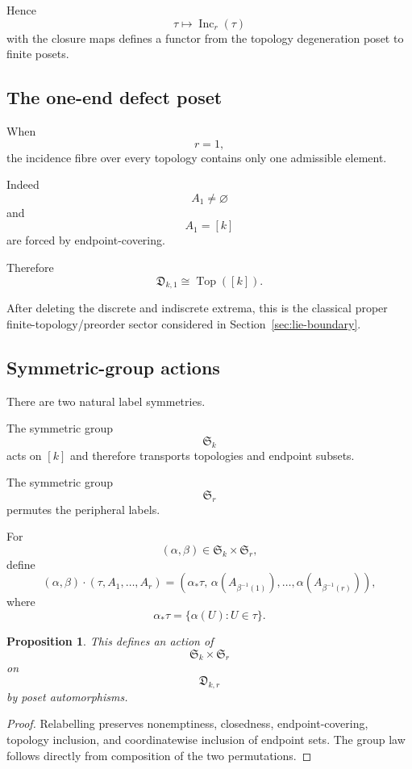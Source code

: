 \documentclass[11pt]{article}
\theoremstyle{plain}
\newtheorem{proposition}[theorem]{Proposition}
\theoremstyle{definition}
\begin{document}
Hence
\[
\tau
\longmapsto
\operatorname{Inc}_r(\tau)
\]
with the closure maps defines a functor from the topology degeneration
poset to finite posets.


\subsection{The one-end defect poset}
\label{subsec:r1-poset-preview}

When
\[
r=1,
\]
the incidence fibre over every topology contains only one admissible
element.

Indeed
\[
A_1\neq\varnothing
\]
and
\[
A_1=[k]
\]
are forced by endpoint-covering.

Therefore
\[
\mathfrak D_{k,1}
\cong
\operatorname{Top}([k]).
\]

After deleting the discrete and indiscrete extrema, this is the classical proper finite-topology/preorder sector considered in Section~\ref{sec:lie-boundary}.

\subsection{Symmetric-group actions}
\label{subsec:defect-poset-symmetry}

There are two natural label symmetries.

The symmetric group
\[
\mathfrak S_k
\]
acts on $[k]$ and therefore transports topologies and endpoint subsets.

The symmetric group
\[
\mathfrak S_r
\]
permutes the peripheral labels.

For
\[
(\alpha,\beta)
\in
\mathfrak S_k\times\mathfrak S_r,
\]
define
\[
(\alpha,\beta)\cdot
(\tau,A_1,\ldots,A_r)
=
\left(
\alpha_*\tau,\,
\alpha(A_{\beta^{-1}(1)}),
\ldots,
\alpha(A_{\beta^{-1}(r)})
\right),
\]
where
\[
\alpha_*\tau
=
\{\alpha(U):U\in\tau\}.
\]

\begin{proposition}
\label{prop:Skr-action}
This defines an action of
\[
\mathfrak S_k\times\mathfrak S_r
\]
on
\[
\mathfrak D_{k,r}
\]
by poset automorphisms.
\end{proposition}

\begin{proof}
Relabelling preserves nonemptiness, closedness, endpoint-covering, topology
inclusion, and coordinatewise inclusion of endpoint sets.  The group
law follows directly from composition of the two permutations.
\end{proof}
\end{document}
